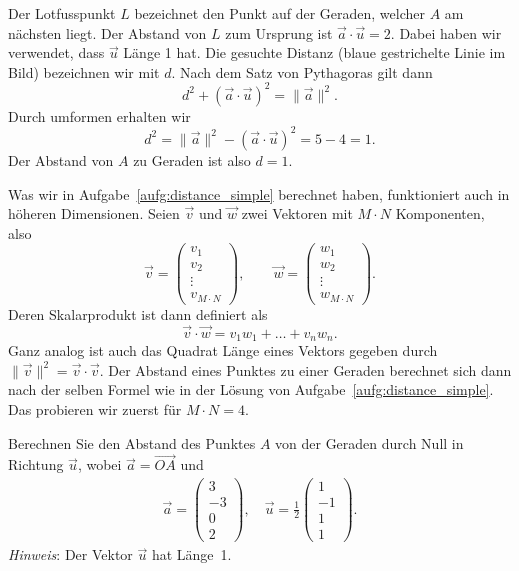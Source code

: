 \begin{losung}
	Der Lotfusspunkt $L$ bezeichnet den Punkt auf der Geraden, welcher $A$ am nächsten liegt.
	Der Abstand von $L$ zum Ursprung ist $\vec{a}\cdot\vec{u}=2$.
	Dabei haben wir verwendet, dass $\vec{u}$ Länge 1 hat.
	Die gesuchte Distanz (blaue gestrichelte Linie im Bild) bezeichnen wir mit $d$.
	Nach dem Satz von Pythagoras gilt dann
	\begin{equation*}
		d^2+\left(\vec{a}\cdot\vec{u}\right)^2=\lVert\vec{a}\rVert^2.
	\end{equation*}
	Durch umformen erhalten wir
	\begin{equation*}
		d^2=\lVert\vec{a}\rVert^2-\left(\vec{a}\cdot\vec{u}\right)^2=5-4=1.
	\end{equation*}
	Der Abstand von $A$ zu Geraden ist also $d=1$.
\end{losung}
Was wir in Aufgabe~\ref{aufg:distance_simple} berechnet haben, funktioniert auch in höheren Dimensionen.
Seien $\vec v$ und $\vec w$ zwei Vektoren mit $M\cdot N$ Komponenten, also
\begin{equation*}
	\vec v=
	\begin{pmatrix}
		v_1 \\ v_2 \\ \vdots \\ v_{M\cdot N}
	\end{pmatrix},\qquad
	\vec w=
	\begin{pmatrix}
		w_1 \\ w_2 \\ \vdots \\ w_{M\cdot N}
	\end{pmatrix}.
\end{equation*}
Deren Skalarprodukt ist dann definiert als
\begin{equation*}
	\vec v\cdot\vec w=v_1w_1+\ldots+v_nw_n.
\end{equation*}
Ganz analog ist auch das Quadrat Länge eines Vektors gegeben durch $\lVert\vec v\rVert^2=\vec v\cdot\vec v$.
Der Abstand eines Punktes zu einer Geraden berechnet sich dann nach der selben Formel wie in der Lösung von Aufgabe~\ref{aufg:distance_simple}.
Das probieren wir zuerst für $M\cdot N=4$.
\begin{aufgabe} \label{aufg:distance_simple_1}
	Berechnen Sie den Abstand des Punktes $A$ von der Geraden durch Null in Richtung $\vec{u}$, wobei $\vec{a}=\overrightarrow{OA}$ und
	\begin{align*}
		\vec{a}=
		\begin{pmatrix}
			3 \\ -3 \\ 0 \\ 2
		\end{pmatrix},\quad
		\vec{u}=\frac{1}{2}
		\begin{pmatrix}
			1 \\ -1 \\ 1 \\ 1
		\end{pmatrix}.
	\end{align*}
	\textit{Hinweis}: Der Vektor $\vec{u}$ hat Länge~1.
\end{aufgabe}
